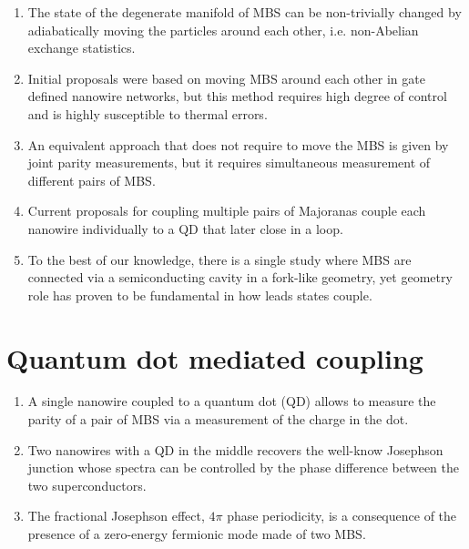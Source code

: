 \begin{enumerate}
\item The state of the degenerate manifold of MBS can be non-trivially changed by adiabatically moving the particles around each other, i.e. non-Abelian exchange statistics.
\item Initial proposals were based on moving MBS around each other in gate defined nanowire networks, but this method requires high degree of control and is highly susceptible to thermal errors.
\item An equivalent approach that does not require to move the MBS is given by joint parity measurements, but it requires simultaneous measurement of different pairs of MBS.
\item Current proposals for coupling multiple pairs of Majoranas couple each nanowire individually to a QD that later close in a loop.
\item To the best of our knowledge, there is a single study where MBS are connected via a semiconducting cavity in a fork-like geometry, yet geometry role has proven to be fundamental in how leads states couple.
\end{enumerate}

\section{Quantum dot mediated coupling}

\begin{enumerate}
\item A single nanowire coupled to a quantum dot (QD) allows to measure the parity of a pair of MBS via a measurement of the charge in the dot.
\item Two nanowires with a QD in the middle recovers the well-know Josephson junction whose spectra can be controlled by the phase difference between the two superconductors.
\item The fractional Josephson effect, $4\pi$ phase periodicity, is a consequence of the presence of a zero-energy fermionic mode made of two MBS.

\end{enumerate}

